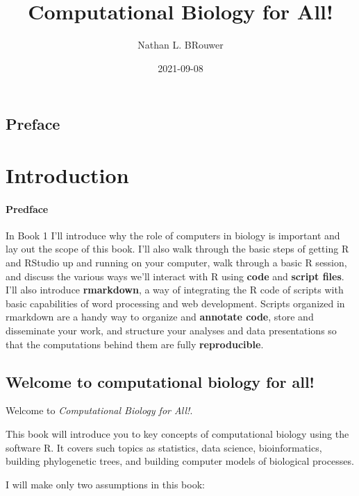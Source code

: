 \documentclass[
]{book}
\title{Computational Biology for All!}
\author{Nathan L. BRouwer}
\date{2021-09-08}
\begin{document}
\maketitle

{
\setcounter{tocdepth}{1}
\tableofcontents
}
\hypertarget{preface}{%
\chapter*{Preface}\label{preface}}

\hypertarget{part-introduction}{%
\part{Introduction}\label{part-introduction}}

\hypertarget{predface}{%
\subsection*{Predface}\label{predface}}

In Book 1 I'll introduce why the role of computers in biology is important and lay out the scope of this book. I'll also walk through the basic steps of getting R and RStudio up and running on your computer, walk through a basic R session, and discuss the various ways we'll interact with R using \textbf{code} and \textbf{script files}. I'll also introduce \textbf{rmarkdown}, a way of integrating the R code of scripts with basic capabilities of word processing and web development. Scripts organized in rmarkdown are a handy way to organize and \textbf{annotate code}, store and disseminate your work, and structure your analyses and data presentations so that the computations behind them are fully \textbf{reproducible}.

\hypertarget{intro}{%
\chapter{Welcome to computational biology for all!}\label{intro}}

Welcome to \emph{Computational Biology for All!}.

This book will introduce you to key concepts of computational biology using the software R. It covers such topics as statistics, data science, bioinformatics, building phylogenetic trees, and building computer models of biological processes.

I will make only two assumptions in this book:
\end{document}
